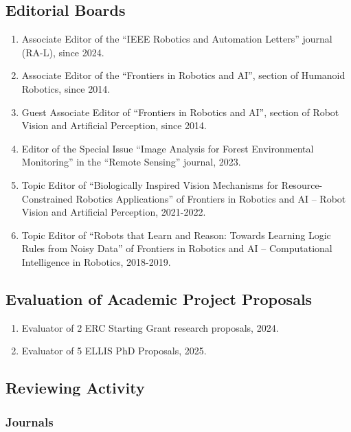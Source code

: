 \documentclass[
]{article}
\begin{document}
\subsection{Editorial Boards}\label{editorial-boards}

\begin{enumerate}
\def\labelenumi{\arabic{enumi}.}
\item
  Associate Editor of the ``IEEE Robotics and Automation Letters''
  journal (RA-L), since 2024.
\item
  Associate Editor of the ``Frontiers in Robotics and AI'', section of
  Humanoid Robotics, since 2014.
\item
  Guest Associate Editor of ``Frontiers in Robotics and AI'', section of
  Robot Vision and Artificial Perception, since 2014.
\item
  Editor of the Special Issue ``Image Analysis for Forest Environmental
  Monitoring'' in the ``Remote Sensing'' journal, 2023.
\item
  Topic Editor of ``Biologically Inspired Vision Mechanisms for
  Resource-Constrained Robotics Applications'' of Frontiers in Robotics
  and AI -- Robot Vision and Artificial Perception, 2021-2022.
\item
  Topic Editor of ``Robots that Learn and Reason: Towards Learning Logic
  Rules from Noisy Data'' of Frontiers in Robotics and AI --
  Computational Intelligence in Robotics, 2018-2019.
\end{enumerate}

\subsection{Evaluation of Academic Project
Proposals}\label{evaluation-of-academic-project-proposals}

\begin{enumerate}
\def\labelenumi{\arabic{enumi}.}
\item
  Evaluator of 2 ERC Starting Grant research proposals, 2024.
\item
  Evaluator of 5 ELLIS PhD Proposals, 2025.
\end{enumerate}

\subsection{Reviewing Activity}\label{reviewing-activity}

\subsubsection{Journals}\label{journals}
\end{document}
